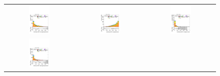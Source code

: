   \begin{figure}[htbp]
    \centering
    \setlength{\tabcolsep}{2pt}
    \renewcommand{\arraystretch}{0}
    
    \begin{tabular}{ccc}
      \includegraphics[width=0.32\textwidth]{images/sr_cr_plots/plot_tth_signal_multiclass_lt200_hh_tth_cr_ttbar.pdf} &
      \includegraphics[width=0.32\textwidth]{images/sr_cr_plots/plot_tth_ttbar_multiclass_lt200_hh_tth_cr_ttbar.pdf} &
      \includegraphics[width=0.32\textwidth]{images/sr_cr_plots/plot_tth_Z_multiclass_lt200_hh_tth_cr_ttbar.pdf} \\[4pt]
      \includegraphics[width=0.32\textwidth]{images/sr_cr_plots/plot_tth_signal_multiclass_gt200_hh_tth_cr_ttbar.pdf} &

\end{tabular}
\end{figure}
